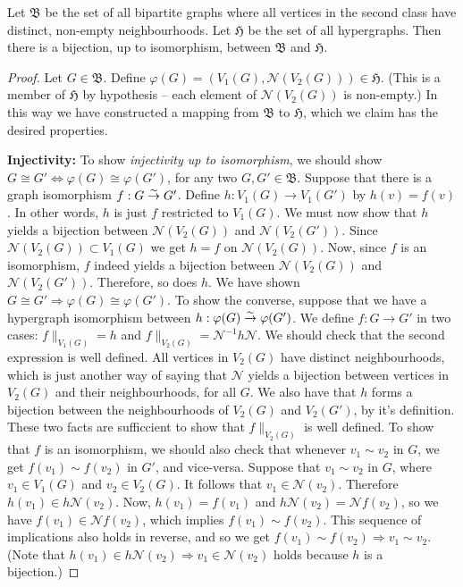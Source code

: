 \begin{lemma}
Let $\mathfrak{B}$ be the set of all bipartite graphs where all vertices in the second class have distinct, non-empty neighbourhoods.
Let $\mathfrak{H}$ be the set of all hypergraphs.
Then there is a bijection, up to isomorphism, between $\mathfrak{B}$ and $\mathfrak{H}$.
\end{lemma}
\begin{proof}
Let $G \in \mathfrak{B}$. Define $\varphi(G) = (V_1(G), \mathcal{N}(V_2(G))) \in \mathfrak{H}$.
(This is a member of $\mathfrak{H}$ by hypothesis -- each element of $\mathcal{N}(V_2(G))$ is non-empty.)
In this way we have constructed a mapping from $\mathfrak{B}$ to $\mathfrak{H}$, which we claim has the desired properties.

\textbf{Injectivity:}
To show \emph{injectivity up to isomorphism}, we should show $G \cong G' \Leftrightarrow \varphi(G) \cong \varphi(G')$, for any two $G,G' \in \mathfrak{B}$.
Suppose that there is a graph isomorphism $f: G \overset\sim\to G'$.
Define $h: V_1(G) \rightarrow V_1(G')$ by $h(v) = f(v)$. In other words, $h$ is just $f$ restricted to $V_1(G)$.
We must now show that $h$ yields a bijection between $\mathcal{N}(V_2(G))$ and $\mathcal{N}(V_2(G'))$.
Since $\mathcal{N}(V_2(G)) \subset V_1(G)$ we get $h = f$ on $\mathcal{N}(V_2(G))$.
Now, since $f$ is an isomorphism, $f$ indeed yields a bijection between $\mathcal{N}(V_2(G))$ and $\mathcal{N}(V_2(G'))$. Therefore, so does $h$.
We have shown $G \cong G' \Rightarrow \varphi(G) \cong \varphi(G')$.
To show the converse, suppose that we have a hypergraph isomorphism between $h: \varphi(G) \overset\sim\to \varphi(G')$.
We define $f: G \rightarrow G'$ in two cases: $f \|_{V_1(G)} = h$ and $f \|_{V_2(G)} = \mathcal{N}^{-1} h \mathcal{N}$.
We should check that the second expression is well defined. All vertices in $V_2(G)$ have distinct neighbourhoods, which is just another way of saying that $\mathcal{N}$ yields a bijection between vertices in $V_2(G)$ and their neighbourhoods, for all $G$. We also have that $h$ forms a bijection between the neighbourhoods of $V_2(G)$ and $V_2(G')$, by it's definition. These two facts are sufficcient to show that $f \|_{V_2(G)}$ is well defined.
To show that $f$ is an isomorphism, we should also check that whenever $v_1 \sim v_2$ in $G$, we get $f(v_1) \sim f(v_2)$ in $G'$, and vice-versa.
Suppose that $v_1 \sim v_2$ in $G$, where $v_1 \in V_1(G)$ and $v_2 \in V_2(G)$. It follows that $v_1 \in \mathcal{N}(v_2)$.
Therefore $h(v_1) \in h \mathcal{N}( v_2 )$.
Now, $h(v_1) = f(v_1)$ and $h \mathcal{N} (v_2) = \mathcal{N} f (v_2) $, so we have $f(v_1) \in \mathcal{N} f (v_2)$, which implies $f(v_1) \sim f(v_2)$.
This sequence of implications also holds in reverse, and so we get $f(v_1) \sim f(v_2) \Rightarrow v_1 \sim v_2$. (Note that $h(v_1) \in h \mathcal{N}(v_2) \Rightarrow v_1 \in \mathcal{N}(v_2)$ holds because $h$ is a bijection.)


\end{proof}
